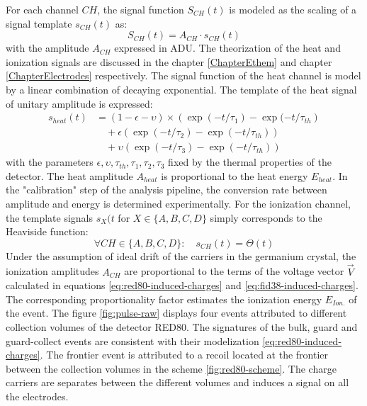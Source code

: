 For each channel $CH$, the signal function $S_{CH}(t)$ is modeled as the scaling of a signal template $s_{CH}(t)$ as:
\begin{equation}
S_{CH}(t) = A_{CH} \cdot s_{CH}(t)
\end{equation}
with the amplitude $A_{CH}$ expressed in ADU.
The theorization of the heat and ionization signals are discussed in the chapter \ref{ChapterEthem} and chapter \ref{ChapterElectrodes} respectively. The signal function of the heat channel is model by a linear combination of decaying exponential. The template of the heat signal of unitary amplitude is expressed:
\begin{equation}
\label{eq:heat-channel-signal-function}
\begin{split}
s_{heat}(t)
&=
(1 - \epsilon - \upsilon) \times \left( \exp(-t/\tau_{1}) - \exp(-t/\tau_{th} \right)
\\
& \quad +
\epsilon \left( \exp(-t/\tau_{2}) - \exp(-t/\tau_{th}) \right)
\\
& \quad +
\upsilon \left( \exp(-t/\tau_{3}) - \exp(-t/\tau_{th}) \right)
\end{split}
\end{equation}
with the parameters $\epsilon, \upsilon, \tau_{th}, \tau_1, \tau_2, \tau_3$ fixed by the thermal properties of the detector. The heat amplitude $A_{heat}$ is proportional to the heat energy $E_{heat}$. In the "calibration" step of the analysis pipeline, the conversion rate between amplitude and energy is determined experimentally. 
For the ionization channel, the template signals $s_{X}(t$ for $X \in \{A,B,C,D\}$ simply corresponds to the Heaviside function:
\begin{equation}
\label{eq:ionization-channel-signl-function}
\forall CH \in \{A,B,C,D\}: \quad s_{CH}(t) = \Theta(t)
\end{equation}
Under the assumption of ideal drift of the carriers in the germanium crystal, the ionization amplitudes $A_{CH}$ are proportional to the terms of the voltage vector $\vec{V}$ calculated in equations \ref{eq:red80-induced-charges} and \ref{eq:fid38-induced-charges}. The corresponding proportionality factor estimates the ionization energy $E_{Ion.}$ of the event. The figure \ref{fig:pulse-raw} displays four events attributed to different collection volumes of the detector RED80. The signatures of the bulk, guard and guard-collect events are consistent with their modelization \ref{eq:red80-induced-charges}. The frontier event is attributed to a recoil located at the frontier between the collection volumes in the scheme \ref{fig:red80-scheme}. The charge carriers are separates between the different volumes and induces a signal on all the electrodes.



